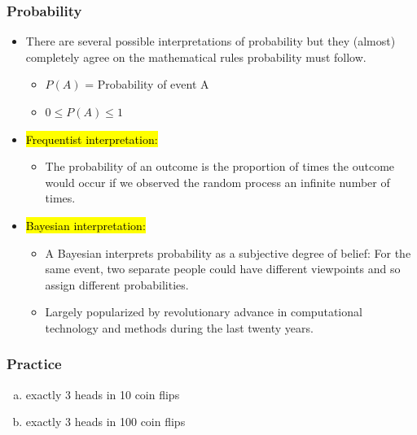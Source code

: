 \documentclass[notes,11pt, aspectratio=169]{beamer}
\begin{document}

\begin{frame}
\frametitle{Probability}

\begin{itemize}

\item There are several possible interpretations of probability but they (almost) completely agree on the mathematical rules probability must follow.
\begin{itemize}
\item $P(A)$ = Probability of event A 
\item $0 \le P(A) \le 1$
\end{itemize}

\pause

\item \hl{Frequentist interpretation:} 
\begin{itemize}
\item The probability of an outcome is the proportion of times the outcome would occur if we observed the random process an infinite number of times.
\end{itemize}

\pause

\item \hl{Bayesian interpretation:} 
\begin{itemize}
\item  A Bayesian interprets probability as a subjective degree of belief: For the same event, two separate people could have different viewpoints and so assign different probabilities.
\item Largely popularized by revolutionary advance in computational technology and methods during the last twenty years.
\end{itemize}

\end{itemize}

\end{frame}


\begin{frame}
\frametitle{Practice}


\begin{enumerate}[(a)]
\item exactly 3 heads in 10 coin flips
\item exactly 3 heads in 100 coin flips
\end{enumerate}

\end{frame}
\end{document}
